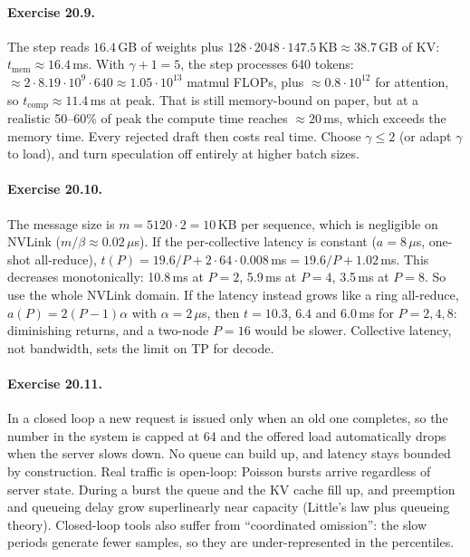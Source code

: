 \paragraph{Exercise 20.9.} The step reads $16.4$\,GB of weights plus
$128\cdot2048\cdot147.5$\,KB$\approx38.7$\,GB of KV: $t_{\text{mem}}\approx16.4$\,ms. With
$\gamma+1=5$, the step processes 640 tokens: $\approx2\cdot8.19\cdot10^9\cdot640\approx
1.05\cdot10^{13}$ matmul FLOPs, plus $\approx0.8\cdot10^{12}$ for attention, so
$t_{\text{comp}}\approx11.4$\,ms at peak. That is still memory-bound on paper, but at a
realistic 50--60\% of peak the compute time reaches $\approx20$\,ms, which exceeds the
memory time. Every rejected draft then costs real time. Choose $\gamma\le2$ (or adapt
$\gamma$ to load), and turn speculation off entirely at higher batch sizes.

\paragraph{Exercise 20.10.} The message size is $m=5120\cdot2=10$\,KB per sequence, which
is negligible on NVLink ($m/\beta\approx0.02\,\mu$s). If the per-collective latency is
constant ($a=8\,\mu$s, one-shot all-reduce),
$t(P)=19.6/P+2\cdot64\cdot0.008$\,ms$=19.6/P+1.02$\,ms. This decreases monotonically:
10.8\,ms at $P=2$, 5.9\,ms at $P=4$, 3.5\,ms at $P=8$. So use the whole NVLink domain. If
the latency instead grows like a ring all-reduce, $a(P)=2(P-1)\alpha$ with
$\alpha=2\,\mu$s, then $t=10.3$, $6.4$ and $6.0$\,ms for $P=2,4,8$: diminishing returns,
and a two-node $P=16$ would be slower. Collective latency, not bandwidth, sets the limit
on TP for decode.

\paragraph{Exercise 20.11.} In a closed loop a new request is issued only when an old one
completes, so the number in the system is capped at 64 and the offered load automatically
drops when the server slows down. No queue can build up, and latency stays bounded by
construction. Real traffic is open-loop: Poisson bursts arrive regardless of server
state. During a burst the queue and the KV cache fill up, and preemption and queueing
delay grow superlinearly near capacity (Little's law plus queueing theory). Closed-loop
tools also suffer from ``coordinated omission'': the slow periods generate fewer samples,
so they are under-represented in the percentiles.

